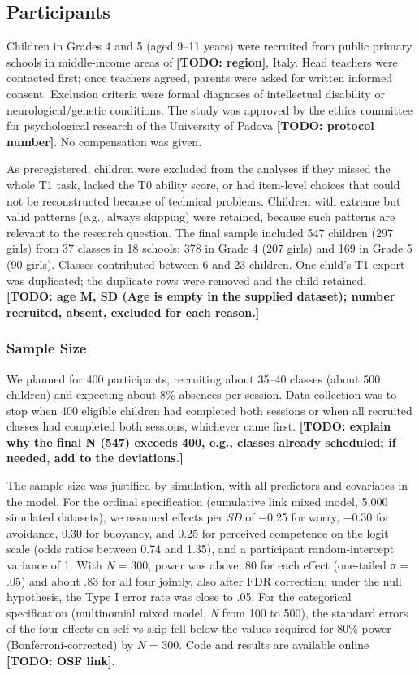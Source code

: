 \documentclass[
  man,
  floatsintext,
  longtable,
  nolmodern,
  notxfonts,
  notimes,
  colorlinks=true,linkcolor=blue,citecolor=blue,urlcolor=blue]{apa7}
\begin{document}
\subsection{Participants}\label{participants}

Children in Grades 4 and 5 (aged 9--11 years) were recruited from public
primary schools in middle-income areas of \textbf{{[}TODO: region{]}},
Italy. Head teachers were contacted first; once teachers agreed, parents
were asked for written informed consent. Exclusion criteria were formal
diagnoses of intellectual disability or neurological/genetic conditions.
The study was approved by the ethics committee for psychological
research of the University of Padova \textbf{{[}TODO: protocol
number{]}}. No compensation was given.

As preregistered, children were excluded from the analyses if they
missed the whole T1 task, lacked the T0 ability score, or had item-level
choices that could not be reconstructed because of technical problems.
Children with extreme but valid patterns (e.g., always skipping) were
retained, because such patterns are relevant to the research question.
The final sample included 547 children (297 girls) from 37 classes in 18
schools: 378 in Grade 4 (207 girls) and 169 in Grade 5 (90 girls).
Classes contributed between 6 and 23 children. One child's T1 export was
duplicated; the duplicate rows were removed and the child retained.
\textbf{{[}TODO: age M, SD (Age is empty in the supplied dataset);
number recruited, absent, excluded for each reason.{]}}

\subsubsection{Sample Size}\label{sample-size}

We planned for 400 participants, recruiting about 35--40 classes (about
500 children) and expecting about 8\% absences per session. Data
collection was to stop when 400 eligible children had completed both
sessions or when all recruited classes had completed both sessions,
whichever came first. \textbf{{[}TODO: explain why the final N (547)
exceeds 400, e.g., classes already scheduled; if needed, add to the
deviations.{]}}

The sample size was justified by simulation, with all predictors and
covariates in the model. For the ordinal specification (cumulative link
mixed model, 5,000 simulated datasets), we assumed effects per \emph{SD}
of −0.25 for worry, −0.30 for avoidance, 0.30 for buoyancy, and 0.25 for
perceived competence on the logit scale (odds ratios between 0.74 and
1.35), and a participant random-intercept variance of 1. With \emph{N} =
300, power was above .80 for each effect (one-tailed α = .05) and about
.83 for all four jointly, also after FDR correction; under the null
hypothesis, the Type I error rate was close to .05. For the categorical
specification (multinomial mixed model, \emph{N} from 100 to 500), the
standard errors of the four effects on self vs skip fell below the
values required for 80\% power (Bonferroni-corrected) by \emph{N} = 300.
Code and results are available online \textbf{{[}TODO: OSF link{]}}.
\end{document}
